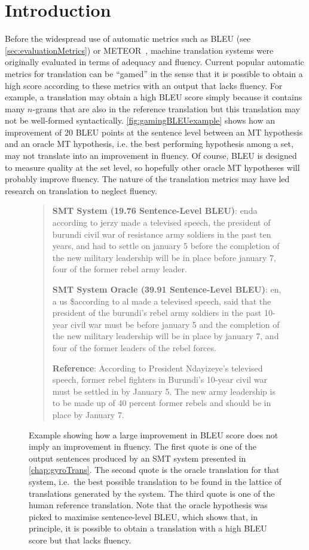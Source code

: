 
\section{Introduction}

Before the widespread use of automatic metrics such as
BLEU (see \autoref{sec:evaluationMetrics}) or
METEOR~\citep{banerjee-lavie:2005:MTSumm}, machine translation
systems were originally evaluated in terms of adequacy
and fluency.
Current popular automatic metrics for translation can be ``gamed'' in the
sense that it is possible to obtain a high score according to these
metrics with an output that lacks fluency.
For example, a translation may obtain a high BLEU score simply
because it contains many $n$-grams that are also in the reference
translation but this translation may not be well-formed syntactically.
\autoref{fig:gamingBLEUexample} shows how an improvement of
20 BLEU points at the sentence level between an MT hypothesis
and an oracle MT hypothesis, i.e. the best performing hypothesis among a set, may
not translate into
an improvement in fluency. Of course, BLEU is designed to
measure quality at the set level, so hopefully other oracle MT
hypotheses will probably improve fluency.
The nature of the translation metrics may have led research on translation to neglect fluency.
%
\begin{figure}
\begin{quote}
  \textbf{SMT System (19.76 Sentence-Level BLEU)}: enda according to jerzy made a televised speech, the president of burundi civil war of resistance army soldiers in the past ten years, and had to settle on january 5 before the completion of the new military leadership will be in place before january 7, four of the former rebel army leader.

  \textbf{SMT System Oracle (39.91 Sentence-Level BLEU)}: en, a us \$according to al made a televised speech, said that the president of the burundi's rebel army soldiers in the past 10-year civil war must be before january 5 and the completion of the new military leadership will be in place by january 7, and four of the former leaders of the rebel forces.

  \textbf{Reference}: According to President Ndayizeye's televised speech, former rebel fighters in Burundi's 10-year civil war must be settled in by January 5.  The new army leadership is to be made up of 40 percent former rebels and should be in place by January 7.
\end{quote}
\caption{Example showing how a large improvement in BLEU score does not imply an improvement in fluency.
  The first quote is one of the output sentences produced by an SMT system presented in \autoref{chap:gyroTrans}.
  The second quote is the oracle translation for that system, i.e.\ the best possible translation to be found
  in the lattice of translations generated by the system. The third quote is one of the human reference translation.
  Note that the oracle hypothesis was picked to maximise sentence-level BLEU, which shows that, in principle, it is
  possible to obtain a translation with a high BLEU score but that lacks fluency.
}
\label{fig:gamingBLEUexample}
\end{figure}

